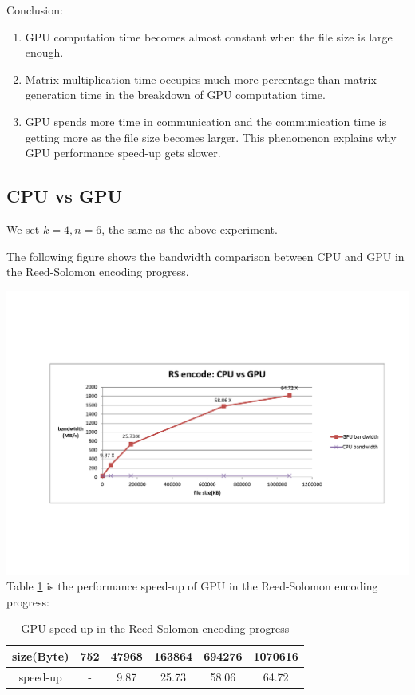 \documentclass[a4paper]{article}
\begin{document}
Conclusion:
\begin{enumerate}
\item GPU computation time becomes almost constant when the file size is large enough.
\item Matrix multiplication time occupies much more percentage than matrix generation time in the breakdown of GPU computation time.
\item GPU spends more time in communication and the communication time is getting more as the file size becomes larger. This phenomenon explains why GPU performance speed-up gets slower.
\end{enumerate}

\subsection{CPU vs GPU}

We set $k=4, n=6$, the same as the above experiment.

The following figure shows the bandwidth comparison between CPU and GPU in the Reed-Solomon encoding progress.

\includegraphics[scale=0.48]{result-graph/encode-CPU-vs-GPU-graph.pdf}
Table \ref{encoding-speed-up} is the performance speed-up of GPU in the Reed-Solomon encoding progress:
\begin{table}
\caption{
GPU speed-up in the Reed-Solomon encoding progress
}
\begin{center}
\begin{tabular}{|c|c|c|c|c|c|}
\hline
size(Byte) &  752 & 47968 & 163864 & 694276 & 1070616 \\
\hline
speed-up   &  -   & 9.87  & 25.73  & 58.06  & 64.72 \\
\hline
\end{tabular}
\label{encoding-speed-up}
\end{center}
\end{table}
\end{document}
